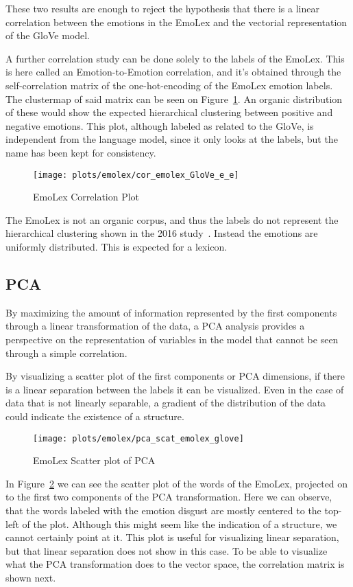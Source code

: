 These two results are enough to reject the hypothesis that there is a linear correlation between the emotions in the EmoLex and the vectorial representation of the GloVe model.


A further correlation study can be done solely to the labels of the EmoLex. This is here called an Emotion-to-Emotion correlation, and it's obtained through the self-correlation matrix of the one-hot-encoding of the EmoLex emotion labels. The clustermap of said matrix can be seen on Figure~\ref{fig:cor_emolex_GloVe_e_e}. An organic distribution of these would show the expected hierarchical clustering between positive and negative emotions. This plot, although labeled as related to the GloVe, is independent from the language model, since it only looks at the labels, but the name has been kept for consistency.

\begin{figure}[H]
  \texttt{[image: plots/emolex/cor\_emolex\_GloVe\_e\_e]}
  \centering
  \caption{EmoLex Correlation Plot}\label{fig:cor_emolex_GloVe_e_e}
\end{figure}

The EmoLex is not an organic corpus, and thus the labels do not represent the hierarchical clustering shown in the 2016 study~\cite{barradas2016thesis}. Instead the emotions are uniformly distributed. This is expected for a lexicon.

\subsection{PCA}
By maximizing the amount of information represented by the first components through a linear transformation of the data, a PCA analysis provides a perspective on the representation of variables in the model that cannot be seen through a simple correlation.

By visualizing a scatter plot of the first components or PCA dimensions, if there is a linear separation between the labels it can be visualized. Even in the case of data that is not linearly separable, a gradient of the distribution of the data could indicate the existence of a structure.

\begin{figure}[H]
  \texttt{[image: plots/emolex/pca\_scat\_emolex\_glove]}
  \centering
  \caption{EmoLex Scatter plot of PCA}\label{fig:pca_scat_emolex_glove}
\end{figure}

In Figure~\ref{fig:pca_scat_emolex_glove} we can see the scatter plot of the words of the EmoLex, projected on to the first two components of the PCA transformation. Here we can observe, that the words labeled with the emotion disgust are mostly centered to the top-left of the plot. Although this might seem like the indication of a structure, we cannot certainly point at it. This plot is useful for visualizing linear separation, but that linear separation does not show in this case. To be able to visualize what the PCA transformation does to the vector space, the correlation matrix is shown next.

